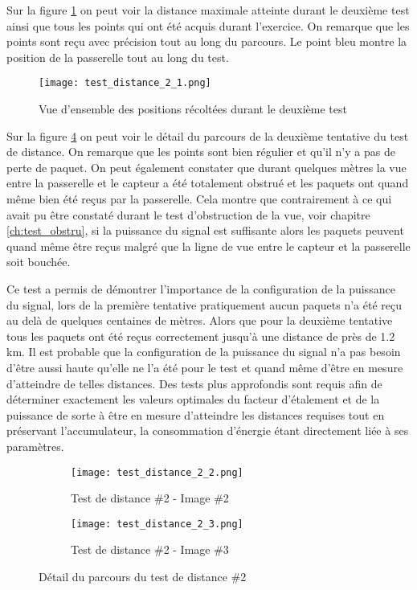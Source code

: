 Sur la figure \ref{fig:test_distance_2_1} on peut voir la distance maximale atteinte durant le deuxième test ainsi que tous les points qui ont été acquis durant l'exercice. On remarque que les points sont reçu avec précision tout au long du parcours. Le point bleu montre la position de la passerelle tout au long du test.

\begin{figure}[htb]
\centering
\texttt{[image: test\_distance\_2\_1.png]} 
\caption{Vue d'ensemble des positions récoltées durant le deuxième test}
\label{fig:test_distance_2_1}
\end{figure}

Sur la figure \ref{fig:test_distance_2_2} on peut voir le détail du parcours de la deuxième tentative du test de distance. On remarque que les points sont bien régulier et qu'il n'y a pas de perte de paquet. On peut également constater que durant quelques mètres la vue entre la passerelle et le capteur a été totalement obstrué et les paquets ont quand même bien été reçus par la passerelle. Cela montre que contrairement à ce qui avait pu être constaté durant le test d'obstruction de la vue, voir chapitre \ref{ch:test_obstru}, si la puissance du signal est suffisante alors les paquets peuvent quand même être reçus malgré que la ligne de vue entre le capteur et la passerelle soit bouchée.

Ce test a permis de démontrer l'importance de la configuration de la puissance du signal, lors de la première tentative pratiquement aucun paquets n'a été reçu au delà de quelques centaines de mètres. Alors que pour la deuxième tentative tous les paquets ont été reçus correctement jusqu'à une distance de près de 1.2 km. Il est probable que la configuration de la puissance du signal n'a pas besoin d'être aussi haute qu'elle ne l'a été pour le test et quand même d'être en mesure d'atteindre de telles distances. Des tests plus approfondis sont requis afin de déterminer exactement les valeurs optimales du facteur d'étalement et de la puissance de sorte à être en mesure d'atteindre les distances requises tout en préservant l'accumulateur, la consommation d'énergie étant directement liée à ses paramètres.

\begin{figure}[tb]
\centering
\begin{subfigure}{0.9\textwidth}
  \centering
  \texttt{[image: test\_distance\_2\_2.png]}
  \caption{Test de distance \#2 - Image \#2}
  \label{fig:test_distance_2_2}
\end{subfigure}%

\begin{subfigure}{0.9\textwidth}
  \centering
  \texttt{[image: test\_distance\_2\_3.png]}
  \caption{Test de distance \#2 - Image \#3}
  \label{fig:test_distance_2_3}
\end{subfigure}
\caption{Détail du parcours du test de distance \#2}
\label{fig:test_distance_2_2}
\end{figure}

